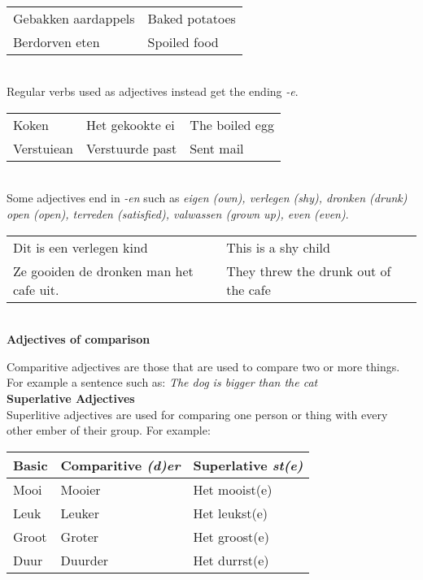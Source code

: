 \documentclass[letterpaper,11pt]{article}
\begin{document}
\\
\begin{tabular}[t]{l l}
    Gebakken aardappels & Baked potatoes \\
    Berdorven eten      & Spoiled food   \\
\end{tabular}
\\
Regular verbs used as adjectives instead get the ending \textit{-e}.
\\
\begin{tabular}[t]{l l l}
    Koken      & Het gekookte ei & The boiled egg \\
    Verstuiean & Verstuurde past & Sent mail      \\
\end{tabular}
\\
Some adjectives end in \textit{-en} such as \textit{eigen (own),
verlegen (shy), dronken (drunk) open (open), terreden (satisfied), valwassen
(grown up), even (even)}.
\\
\begin{tabular}[t]{l l}
    Dit is een verlegen kind & This is a shy child \\
    Ze gooiden de dronken man het cafe uit. & They threw the drunk out of the
    cafe \\
\end{tabular}
\\
\textbf{Adjectives of comparison}
\par{Comparitive adjectives are those that are used to compare two or more
things. For example a sentence such as: \textit{The dog is bigger than the cat}}
\\  
\textbf{Superlative Adjectives}
\\
Superlitive adjectives are used for comparing one person or thing with
every other ember of their group. For example: 
\\
\begin{tabular}[t]{l l l}
    \textbf{Basic} & \textbf{Comparitive \textit{(d)er}} & \textbf{Superlative \textit{st(e)}} \\
    \hline
    Mooi  & Mooier  & Het mooist(e) \\
    Leuk  & Leuker  & Het leukst(e) \\
    Groot & Groter  & Het groost(e) \\
    Duur  & Duurder & Het durrst(e) \\
    \hline
\end{tabular}
\end{document}
